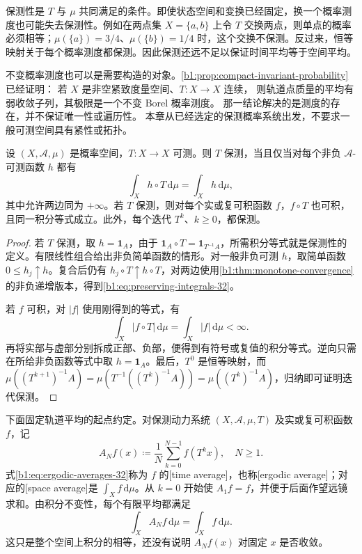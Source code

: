保测性是 \(T\) 与 \(\mu\) 共同满足的条件。即使状态空间和变换已经固定，换一个概率测度也可能失去保测性。例如在两点集 \(X=\{a,b\}\) 上令 \(T\) 交换两点，则单点的概率必须相等；\(\mu(\{a\})=3/4\)、\(\mu(\{b\})=1/4\) 时，这个交换不保测。反过来，恒等映射关于每个概率测度都保测。因此保测还远不足以保证时间平均等于空间平均。

\ProseParagraphBreak

不变概率测度也可以是需要构造的对象。\cref{b1:prop:compact-invariant-probability}已经证明：
若 \(X\) 是非空紧致度量空间、\(T:X\to X\) 连续，
则轨道点质量的平均有弱收敛子列，其极限是一个不变 Borel 概率测度。
那一结论解决的是测度的存在，并不保证唯一性或遍历性。
本章从已经选定的保测概率系统出发，不要求一般可测空间具有紧性或拓扑。

\begin{proposition}[保测性的积分刻画]\label{b1:prop:preserving-integrals-32}
设 \((X,\mathcal A,\mu)\) 是概率空间，\(T\colon X\rightarrow X\) 可测。则 \(T\) 保测，当且仅当对每个非负 \(\mathcal A\)-可测函数 \(h\) 都有
\begin{equation}\label{b1:eq:preserving-integrals-32}
 \int_X h\circ T\,\mathrm d\mu=\int_X h\,\mathrm d\mu,
\end{equation}
其中允许两边同为 \(+\infty\)。若 \(T\) 保测，则对每个实或复可积函数 \(f\)，\(f\circ T\) 也可积，且同一积分等式成立。此外，每个迭代 \(T^k\)、\(k\geq0\)，都保测。
\end{proposition}
\begin{proof}
若 \(T\) 保测，取 \(h=\mathbf1_A\)，由于 \(\mathbf1_A\circ T=\mathbf1_{T^{-1}A}\)，所需积分等式就是保测性的定义。有限线性组合给出非负简单函数的情形。对一般非负可测 \(h\)，取简单函数 \(0\leq h_j\uparrow h\)。复合后仍有 \(h_j\circ T\uparrow h\circ T\)，对两边使用\cref{b1:thm:monotone-convergence}的非负递增版本，得到\eqref{b1:eq:preserving-integrals-32}。

若 \(f\) 可积，对 \(|f|\) 使用刚得到的等式，有
\[
 \int_X |f\circ T|\,\mathrm d\mu
 =\int_X |f|\,\mathrm d\mu<\infty.
\]
再将实部与虚部分别拆成正部、负部，便得到有符号或复值的积分等式。逆向只需在所给非负函数等式中取 \(h=\mathbf1_A\)。最后，\(T^0\) 是恒等映射，而
\(\mu((T^{k+1})^{-1}A)=\mu(T^{-1}((T^k)^{-1}A))=\mu((T^k)^{-1}A)\)，归纳即可证明迭代保测。
\end{proof}

下面固定轨道平均的起点约定。对保测动力系统 \((X,\mathcal A,\mu,T)\) 及实或复可积函数 \(f\)，记
\begin{equation}\label{b1:eq:ergodic-averages-32}
 A_Nf(x)\coloneqq\frac1N\sum_{k=0}^{N-1}f(T^kx),\quad N\geq1.
\end{equation}
式\eqref{b1:eq:ergodic-averages-32}称为 \(f\) 的[time average]，也称[ergodic average]；对应的[space average]是 \(\int_Xf\,\mathrm d\mu\)。从 \(k=0\) 开始使 \(A_1f=f\)，并便于后面作望远镜求和。由积分不变性，每个有限平均都满足
\[
 \int_X A_Nf\,\mathrm d\mu=\int_X f\,\mathrm d\mu.
\]
这只是整个空间上积分的相等，还没有说明 \(A_Nf(x)\) 对固定 \(x\) 是否收敛。

